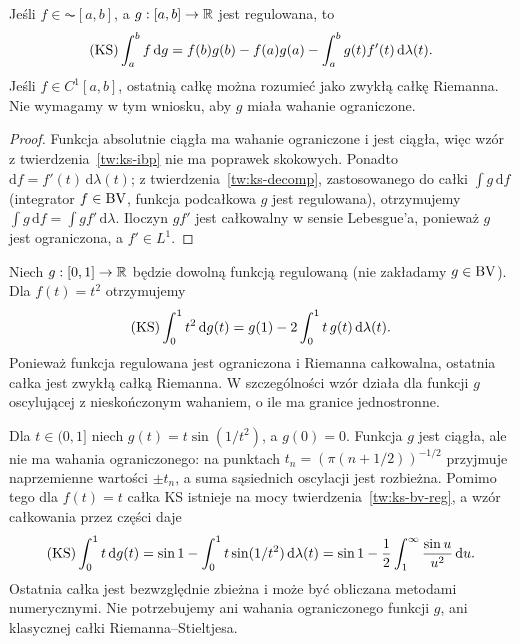 \begin{wniosek}
\label{wn:ks-ibp-ac}
Jeśli $f\in\AC[a,b]$, a $g:[a,b]\to\mathbb R$ jest regulowana, to
\[
 (\mathrm{KS})\int_a^b f\,\mathrm dg
 =f(b)g(b)-f(a)g(a)-\int_a^b g(t)f'(t)\,\mathrm d\lambda(t).
\]
Jeśli $f\in C^1[a,b]$, ostatnią całkę można rozumieć jako zwykłą całkę Riemanna. Nie wymagamy w tym wniosku, aby $g$ miała wahanie ograniczone.
\end{wniosek}
\begin{proof}
Funkcja absolutnie ciągła ma wahanie ograniczone i jest ciągła, więc wzór z twierdzenia~\ref{tw:ks-ibp} nie ma poprawek skokowych. Ponadto $\mathrm df=f'(t)\,\mathrm d\lambda(t)$; z twierdzenia~\ref{tw:ks-decomp}, zastosowanego do całki $\int g\,\mathrm df$ (integrator $f\in\mathrm{BV}$, funkcja podcałkowa $g$ jest regulowana), otrzymujemy $\int g\,\mathrm df=\int gf'\,\mathrm d\lambda$. Iloczyn $gf'$ jest całkowalny w sensie Lebesgue'a, ponieważ $g$ jest ograniczona, a $f'\in L^1$.
\end{proof}

\begin{przyklad}
Niech $g:[0,1]\to\mathbb R$ będzie dowolną funkcją regulowaną (nie zakładamy $g\in\mathrm{BV}$). Dla $f(t)=t^2$ otrzymujemy
\[
 (\mathrm{KS})\int_0^1 t^2\,\mathrm dg(t)=g(1)-2\int_0^1 t\,g(t)\,\mathrm d\lambda(t).
\]
Ponieważ funkcja regulowana jest ograniczona i Riemanna całkowalna, ostatnia całka jest zwykłą całką Riemanna. W szczególności wzór działa dla funkcji $g$ oscylującej z nieskończonym wahaniem, o ile ma granice jednostronne.
\end{przyklad}

\begin{przyklad}
Dla $t\in(0,1]$ niech $g(t)=t\sin(1/t^2)$, a $g(0)=0$. Funkcja $g$ jest ciągła, ale nie ma wahania ograniczonego: na punktach $t_n=(\pi(n+1/2))^{-1/2}$ przyjmuje naprzemienne wartości $\pm t_n$, a suma sąsiednich oscylacji jest rozbieżna. Pomimo tego dla $f(t)=t$ całka KS istnieje na mocy twierdzenia~\ref{tw:ks-bv-reg}, a wzór całkowania przez części daje
\[
 (\mathrm{KS})\int_0^1 t\,\mathrm dg(t)
 =\sin1-\int_0^1 t\sin(1/t^2)\,\mathrm d\lambda(t)
 =\sin1-\frac12\int_1^\infty\frac{\sin u}{u^2}\,\mathrm du.
\]
Ostatnia całka jest bezwzględnie zbieżna i może być obliczana metodami numerycznymi. Nie potrzebujemy ani wahania ograniczonego funkcji $g$, ani klasycznej całki Riemanna--Stieltjesa.
\end{przyklad}

